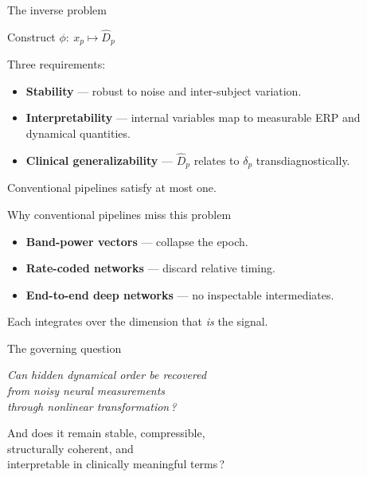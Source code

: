 \documentclass[11pt,aspectratio=169]{beamer}
\begin{document}
\begin{frame}{The inverse problem}
  \vspace{0.8em}
  \begin{center}\large
    Construct $\phi:\ x_p \mapsto \hat{D}_p$
  \end{center}
  \vspace{0.8em}
  Three requirements:
  \begin{itemize}
    \item \textbf{Stability} --- robust to noise and inter-subject variation.
    \item \textbf{Interpretability} --- internal variables map to measurable
      ERP and dynamical quantities.
    \item \textbf{Clinical generalizability} --- $\hat{D}_p$ relates to
      $\delta_p$ transdiagnostically.
  \end{itemize}
  \vspace{0.6em}
  \begin{center}\color{sbnavy}\small Conventional pipelines satisfy at most one.\end{center}
\end{frame}

\begin{frame}{Why conventional pipelines miss this problem}
  \vspace{0.6em}
  \begin{itemize}
    \item \textbf{Band-power vectors} --- collapse the epoch.
    \item \textbf{Rate-coded networks} --- discard relative timing.
    \item \textbf{End-to-end deep networks} --- no inspectable intermediates.
  \end{itemize}
  \vspace{0.8em}
  \begin{center}\color{sbnavy}
    Each integrates over the dimension that \emph{is} the signal.
  \end{center}
\end{frame}

\begin{frame}{The governing question}
  \vspace{1.2em}
  \begin{center}\large\itshape
    Can hidden dynamical order be recovered\\
    from noisy neural measurements\\
    through nonlinear transformation\,?
  \end{center}
  \vspace{1.0em}
  \begin{center}
    And does it remain \alert{stable}, \alert{compressible},\\
    \alert{structurally coherent}, and\\
    \alert{interpretable in clinically meaningful terms}\,?
  \end{center}
\end{frame}
\end{document}
